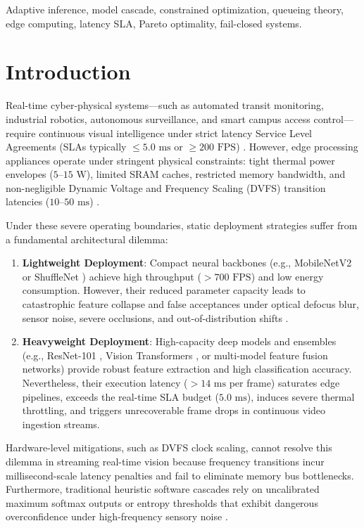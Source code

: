 \documentclass[conference]{IEEEtran}
\begin{document}
\begin{IEEEkeywords}
Adaptive inference, model cascade, constrained optimization, queueing theory, edge computing, latency SLA, Pareto optimality, fail-closed systems.
\end{IEEEkeywords}

\section{Introduction}
Real-time cyber-physical systems—such as automated transit monitoring, industrial robotics, autonomous surveillance, and smart campus access control—require continuous visual intelligence under strict latency Service Level Agreements (SLAs typically $\le 5.0\text{ ms}$ or $\ge 200\text{ FPS}$) \cite{satyanarayanan2017emergence, chen2019deep}. However, edge processing appliances operate under stringent physical constraints: tight thermal power envelopes ($5\text{--}15\text{ W}$), limited SRAM caches, restricted memory bandwidth, and non-negligible Dynamic Voltage and Frequency Scaling (DVFS) transition latencies ($10\text{--}50\text{ ms}$) \cite{canziani2016analysis, kang2017neurosurgeon}.

Under these severe operating boundaries, static deployment strategies suffer from a fundamental architectural dilemma:
\begin{enumerate}
    \item \textbf{Lightweight Deployment}: Compact neural backbones (e.g., MobileNetV2 \cite{sandler2018mobilenetv2} or ShuffleNet \cite{zhang2018shufflenet}) achieve high throughput ($>700\text{ FPS}$) and low energy consumption. However, their reduced parameter capacity leads to catastrophic feature collapse and false acceptances under optical defocus blur, sensor noise, severe occlusions, and out-of-distribution shifts \cite{hendrycks2019benchmarking}.
    \item \textbf{Heavyweight Deployment}: High-capacity deep models and ensembles (e.g., ResNet-101 \cite{he2016deep}, Vision Transformers \cite{vaswani2017attention}, or multi-model feature fusion networks) provide robust feature extraction and high classification accuracy. Nevertheless, their execution latency ($>14\text{ ms}$ per frame) saturates edge pipelines, exceeds the real-time SLA budget ($5.0\text{ ms}$), induces severe thermal throttling, and triggers unrecoverable frame drops in continuous video ingestion streams.
\end{enumerate}

Hardware-level mitigations, such as DVFS clock scaling, cannot resolve this dilemma in streaming real-time vision because frequency transitions incur millisecond-scale latency penalties and fail to eliminate memory bus bottlenecks. Furthermore, traditional heuristic software cascades rely on uncalibrated maximum softmax outputs or entropy thresholds that exhibit dangerous overconfidence under high-frequency sensory noise \cite{guo2017calibration, nguyen2015deep}.
\end{document}
